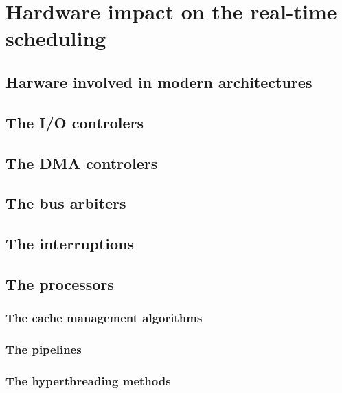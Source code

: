
\chapter{Hardware impact on the real-time scheduling}

\section{Harware involved in modern architectures}

\section{The I/O controlers}

\section{The DMA controlers}

\section{The bus arbiters}

\section{The interruptions}

\section{The processors}

\subsection{The cache management algorithms}

\subsection{The pipelines}

\subsection{The hyperthreading methods}

